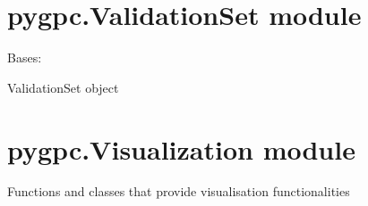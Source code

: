 \documentclass[letterpaper,10pt,english,openany,oneside]{sphinxmanual}
\begin{document}
\begin{fulllineitems}
\label{\detokenize{pygpc:pygpc.TestBench.run_test}}
\end{fulllineitems}



\section{pygpc.ValidationSet module}
\label{\detokenize{pygpc:module-pygpc.ValidationSet}}\label{\detokenize{pygpc:pygpc-validationset-module}}

\begin{fulllineitems}
\label{\detokenize{pygpc:pygpc.ValidationSet.ValidationSet}}
Bases: 

ValidationSet object

\end{fulllineitems}



\section{pygpc.Visualization module}
\label{\detokenize{pygpc:module-pygpc.Visualization}}\label{\detokenize{pygpc:pygpc-visualization-module}}
Functions and classes that provide visualisation functionalities
\end{document}
